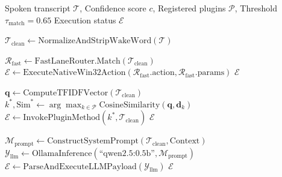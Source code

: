 \documentclass[conference]{IEEEtran}
\begin{document}
\begin{algorithm}[t]
\caption{PRIVACY68 Hybrid Command Dispatch Engine}
\label{alg:dispatch}
\begin{algorithmic}[1]
\REQUIRE Spoken transcript $\mathcal{T}$, Confidence score $c$, Registered plugins $\mathcal{P}$, Threshold $\tau_{\text{match}} = 0.65$
\ENSURE Execution status $\mathcal{E}$

\STATE $\mathcal{T}_{\text{clean}} \leftarrow \text{NormalizeAndStripWakeWord}(\mathcal{T})$

\STATE {}
\STATE $\mathcal{R}_{\text{fast}} \leftarrow \text{FastLaneRouter.Match}(\mathcal{T}_{\text{clean}})$
    \STATE $\mathcal{E} \leftarrow \text{ExecuteNativeWin32Action}(\mathcal{R}_{\text{fast}}.\text{action}, \mathcal{R}_{\text{fast}}.\text{params})$
    \RETURN $\mathcal{E}$ 
\ENDIF

\STATE {}
\STATE $\mathbf{q} \leftarrow \text{ComputeTFIDFVector}(\mathcal{T}_{\text{clean}})$
\STATE $k^*, \text{Sim}^* \leftarrow \arg\max_{k \in \mathcal{P}} \text{CosineSimilarity}(\mathbf{q}, \mathbf{d}_k)$
    \STATE $\mathcal{E} \leftarrow \text{InvokePluginMethod}(k^*, \mathcal{T}_{\text{clean}})$
    \RETURN $\mathcal{E}$
\ENDIF

\STATE {}
\STATE $\mathcal{M}_{\text{prompt}} \leftarrow \text{ConstructSystemPrompt}(\mathcal{T}_{\text{clean}}, \text{Context})$
\STATE $\mathcal{Y}_{\text{llm}} \leftarrow \text{OllamaInference}(\text{``qwen2.5:0.5b''}, \mathcal{M}_{\text{prompt}})$
\STATE $\mathcal{E} \leftarrow \text{ParseAndExecuteLLMPayload}(\mathcal{Y}_{\text{llm}})$
\RETURN $\mathcal{E}$
\end{algorithmic}
\end{algorithm}
\end{document}
